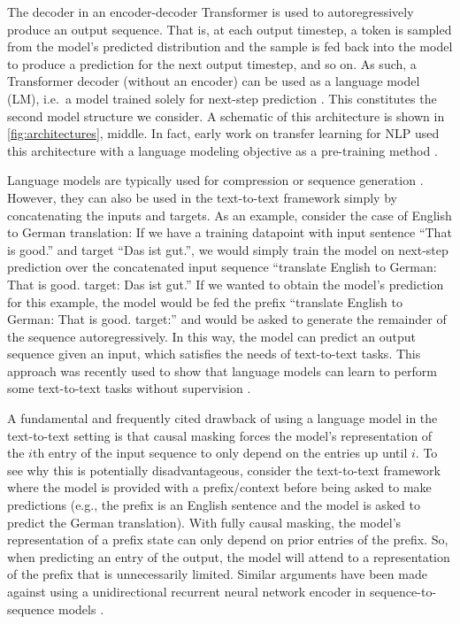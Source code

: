 The decoder in an encoder-decoder Transformer is used to autoregressively produce an output sequence. That is, at each output timestep, a token is sampled from the model's predicted distribution and the sample is fed back into the model to produce a prediction for the next output timestep, and so on. As such, a Transformer decoder (without an encoder) can be used as a language model (LM), i.e.\ a model trained solely for next-step prediction \citep{liu2018generating,radford2018improving,al2019character}. This constitutes the second model structure we consider. A schematic of this architecture is shown in \ref{fig:architectures}, middle. In fact, early work on transfer learning for NLP used this architecture with a language modeling objective as a pre-training method \citep{radford2018improving}.

Language models are typically used for compression or sequence generation \citep{graves2013generating}. However, they can also be used in the text-to-text framework simply by concatenating the inputs and targets. As an example, consider the case of English to German translation: If we have a training datapoint with input sentence ``That is good.'' and target ``Das ist gut.'', we would simply train the model on next-step prediction over the concatenated input sequence ``translate English to German: That is good. target: Das ist gut.'' If we wanted to obtain the model's prediction for this example, the model would be fed the prefix ``translate English to German: That is good. target:'' and would be asked to generate the remainder of the sequence autoregressively. In this way, the model can predict an output sequence given an input, which satisfies the needs of text-to-text tasks. This approach was recently used to show that language models can learn to perform some text-to-text tasks without supervision \citep{radford2019language}.

A fundamental and frequently cited drawback of using a language model in the text-to-text setting is that causal masking forces the model's representation of the $i$th entry of the input sequence to only depend on the entries up until $i$. To see why this is potentially disadvantageous, consider the text-to-text framework where the model is provided with a prefix/context before being asked to make predictions (e.g., the prefix is an English sentence and the model is asked to predict the German translation). With fully causal masking, the model's representation of a prefix state can only depend on prior entries of the prefix. So, when predicting an entry of the output, the model will attend to a representation of the prefix that is unnecessarily limited. Similar arguments have been made against using a unidirectional recurrent neural network encoder in sequence-to-sequence models \citep{bahdanau2014neural}.

